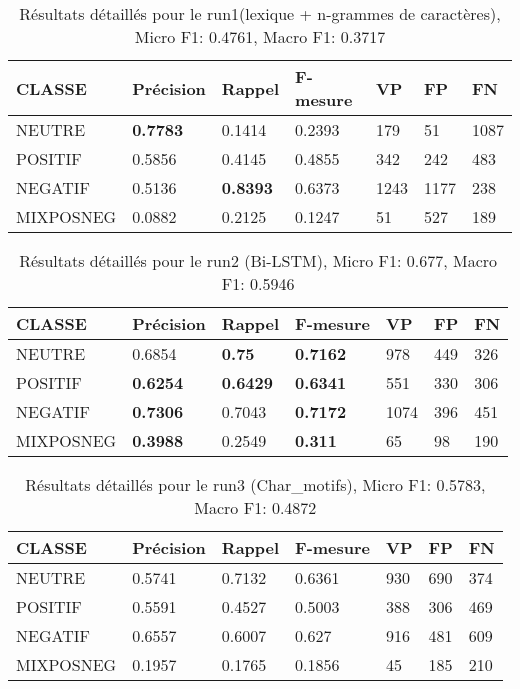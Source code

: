 \begin{table}
\begin{tabular}{l|l|l|l|l|l|l}
  CLASSE	&Précision	&Rappel	&F-mesure	&VP	&FP	&FN\\
\hline
\hline
  NEUTRE	&\textbf{0.7783}	&0.1414	&0.2393	&179	&51	&1087\\
  POSITIF	&0.5856	&0.4145	&0.4855	&342	&242	&483\\
  NEGATIF	&0.5136	&\textbf{0.8393}	&0.6373	&1243	&1177	&238\\
  MIXPOSNEG	&0.0882	&0.2125	&0.1247	&51	&527	&189\\
\hline
\end{tabular}
\caption{Résultats détaillés pour le run1(lexique + n-grammes de caractères),
  Micro F1: 0.4761, Macro F1: 0.3717\label{tab:detail1}}
\end{table}

\begin{table}
\begin{tabular}{l|l|l|l|l|l|l}
  CLASSE	&Précision	&Rappel	&F-mesure	&VP	&FP	&FN\\
\hline
\hline
  NEUTRE	&0.6854	&\textbf{0.75}	&\textbf{0.7162}	&978	&449	&326\\
  POSITIF	&\textbf{0.6254}	&\textbf{0.6429}	&\textbf{0.6341}	&551	&330	&306\\
  NEGATIF	&\textbf{0.7306}	&0.7043	&\textbf{0.7172}	&1074	&396	&451\\
  MIXPOSNEG	&\textbf{0.3988}	&0.2549	&\textbf{0.311}	&65	&98	&190\\
\hline
\end{tabular}
\caption{Résultats détaillés pour le run2 (Bi-LSTM),
  Micro F1: 0.677, Macro F1: 0.5946\label{tab:detail2}}
\end{table}

\begin{table}
\begin{tabular}{l|l|l|l|l|l|l}
  CLASSE	&Précision	&Rappel	&F-mesure	&VP	&FP	&FN\\
\hline
\hline
  NEUTRE	&0.5741	&0.7132	&0.6361	&930	&690	&374\\
  POSITIF	&0.5591	&0.4527	&0.5003	&388	&306	&469\\
  NEGATIF	&0.6557	&0.6007	&0.627	&916	&481	&609\\
  MIXPOSNEG	&0.1957	&0.1765	&0.1856	&45	&185	&210\\
\hline
\end{tabular}
\caption{Résultats détaillés pour le run3 (Char\_motifs),
  Micro F1: 0.5783, Macro F1: 0.4872\label{tab:detail3}}
\end{table}


